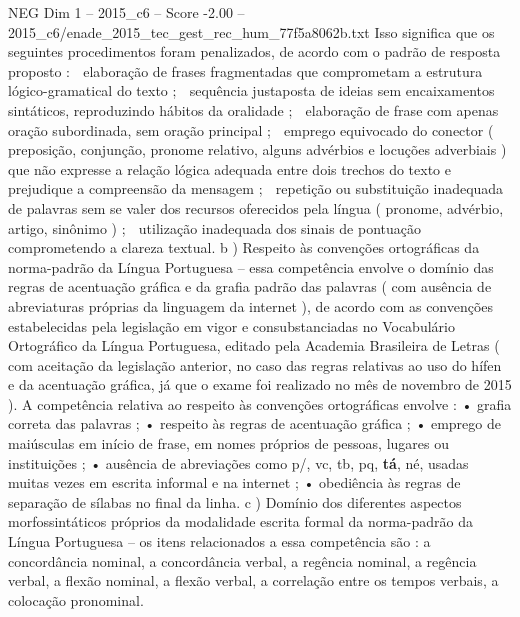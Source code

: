 \begin{textsample}{NEG Dim 1 – 2015\_c6 – Score -2.00 – 2015\_c6/enade\_2015\_tec\_gest\_rec\_hum\_77f5a8062b.txt}
Isso significa que os seguintes procedimentos foram penalizados, de acordo com o padrão de resposta proposto :  elaboração de frases fragmentadas que comprometam a estrutura lógico-gramatical do texto ;  sequência justaposta de ideias sem encaixamentos sintáticos, reproduzindo hábitos da oralidade ;  elaboração de frase com apenas oração subordinada, sem oração principal ;  emprego equivocado do conector ( preposição, conjunção, pronome relativo, alguns advérbios e locuções adverbiais ) que não expresse a relação lógica adequada entre dois trechos do texto e prejudique a compreensão da mensagem ;  repetição ou substituição inadequada de palavras sem se valer dos recursos oferecidos pela língua ( pronome, advérbio, artigo, sinônimo ) ;  utilização inadequada dos sinais de pontuação comprometendo a clareza textual. b ) Respeito às convenções ortográficas da norma-padrão da Língua Portuguesa – essa competência envolve o domínio das regras de acentuação gráfica e da grafia padrão das palavras ( com ausência de abreviaturas próprias da linguagem da internet ), de acordo com as convenções estabelecidas pela legislação em vigor e consubstanciadas no Vocabulário Ortográfico da Língua Portuguesa, editado pela Academia Brasileira de Letras ( com aceitação da legislação anterior, no caso das regras relativas ao uso do hífen e da acentuação gráfica, já que o exame foi realizado no mês de novembro de 2015 ).
A competência relativa ao respeito às convenções ortográficas envolve : • grafia correta das palavras ; • respeito às regras de acentuação gráfica ; • emprego de maiúsculas em início de frase, em nomes próprios de pessoas, lugares ou instituições ; • ausência de abreviações como p/, vc, tb, pq, \textbf{tá}, né, usadas muitas vezes em escrita informal e na internet ; • obediência às regras de separação de sílabas no final da linha. c ) Domínio dos diferentes aspectos morfossintáticos próprios da modalidade escrita formal da norma-padrão da Língua Portuguesa – os itens relacionados a essa competência são : a concordância nominal, a concordância verbal, a regência nominal, a regência verbal, a flexão nominal, a flexão verbal, a correlação entre os tempos verbais, a colocação pronominal.

\end{textsample}
